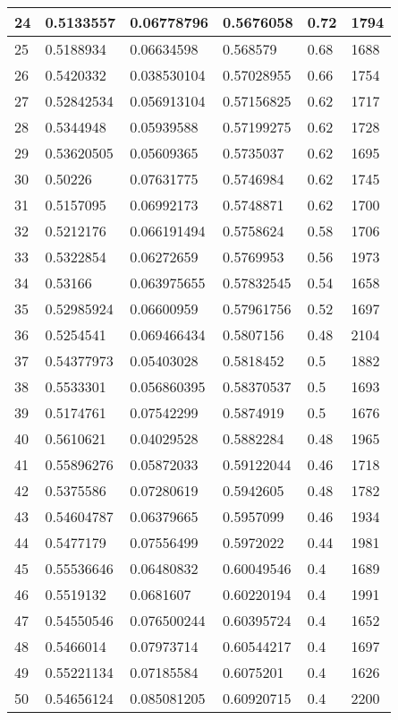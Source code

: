 \begin{longtable}{|l|l|l|l|l|l|}
24 & 0.5133557 & 0.06778796 & 0.5676058 & 0.72 & 1794 \\ \hline 
25 & 0.5188934 & 0.06634598 & 0.568579 & 0.68 & 1688 \\ \hline 
26 & 0.5420332 & 0.038530104 & 0.57028955 & 0.66 & 1754 \\ \hline 
27 & 0.52842534 & 0.056913104 & 0.57156825 & 0.62 & 1717 \\ \hline 
28 & 0.5344948 & 0.05939588 & 0.57199275 & 0.62 & 1728 \\ \hline 
29 & 0.53620505 & 0.05609365 & 0.5735037 & 0.62 & 1695 \\ \hline 
30 & 0.50226 & 0.07631775 & 0.5746984 & 0.62 & 1745 \\ \hline 
31 & 0.5157095 & 0.06992173 & 0.5748871 & 0.62 & 1700 \\ \hline 
32 & 0.5212176 & 0.066191494 & 0.5758624 & 0.58 & 1706 \\ \hline 
33 & 0.5322854 & 0.06272659 & 0.5769953 & 0.56 & 1973 \\ \hline 
34 & 0.53166 & 0.063975655 & 0.57832545 & 0.54 & 1658 \\ \hline 
35 & 0.52985924 & 0.06600959 & 0.57961756 & 0.52 & 1697 \\ \hline 
36 & 0.5254541 & 0.069466434 & 0.5807156 & 0.48 & 2104 \\ \hline 
37 & 0.54377973 & 0.05403028 & 0.5818452 & 0.5 & 1882 \\ \hline 
38 & 0.5533301 & 0.056860395 & 0.58370537 & 0.5 & 1693 \\ \hline 
39 & 0.5174761 & 0.07542299 & 0.5874919 & 0.5 & 1676 \\ \hline 
40 & 0.5610621 & 0.04029528 & 0.5882284 & 0.48 & 1965 \\ \hline 
41 & 0.55896276 & 0.05872033 & 0.59122044 & 0.46 & 1718 \\ \hline 
42 & 0.5375586 & 0.07280619 & 0.5942605 & 0.48 & 1782 \\ \hline 
43 & 0.54604787 & 0.06379665 & 0.5957099 & 0.46 & 1934 \\ \hline 
44 & 0.5477179 & 0.07556499 & 0.5972022 & 0.44 & 1981 \\ \hline 
45 & 0.55536646 & 0.06480832 & 0.60049546 & 0.4 & 1689 \\ \hline 
46 & 0.5519132 & 0.0681607 & 0.60220194 & 0.4 & 1991 \\ \hline 
47 & 0.54550546 & 0.076500244 & 0.60395724 & 0.4 & 1652 \\ \hline 
48 & 0.5466014 & 0.07973714 & 0.60544217 & 0.4 & 1697 \\ \hline 
49 & 0.55221134 & 0.07185584 & 0.6075201 & 0.4 & 1626 \\ \hline 
50 & 0.54656124 & 0.085081205 & 0.60920715 & 0.4 & 2200 \\ \hline 
\end{longtable}